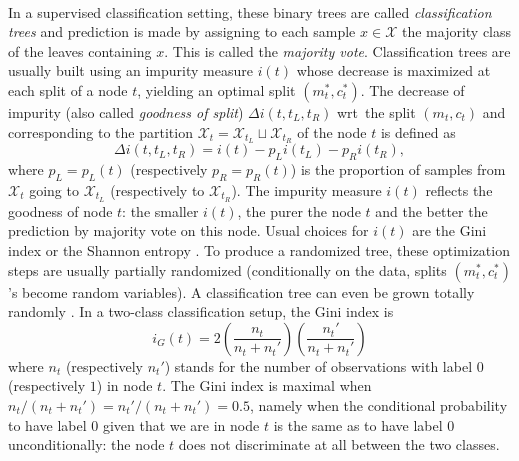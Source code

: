 \paragraph{}
In a supervised classification setting, these binary trees are called
\emph{classification trees} and prediction is made by assigning to each sample
$x \in \mathcal{X}$ the majority class of the leaves containing $x$. This is
called the \emph{majority vote}.  Classification trees are usually built using
an impurity measure $i(t)$ whose decrease is maximized at each split of a node
$t$, yielding an optimal split $(m_t^*, c_t^*)$. The decrease of impurity (also
called \emph{goodness of split}) $\Delta i(t, t_L, t_R)$ \acs{wrt}~the split
$(m_t, c_t)$ and corresponding to the partition
$\mathcal{X}_t=\mathcal{X}_{t_L}\sqcup \mathcal{X}_{t_R}$ of the node $t$ is
defined as
\begin{dmath}
    \label{ocrf:eq:impurity_measure_decrease}
    \Delta i(t, t_L, t_R) = i(t) - p_L i(t_L) - p_R i(t_R),
\end{dmath}
where $p_L = p_L(t)$ (respectively $p_R = p_R(t)$) is the proportion of samples
from $\mathcal{X}_t$ going to $\mathcal{X}_{t_L}$ (respectively to
$\mathcal{X}_{t_R}$).  The impurity measure $i(t)$ reflects the goodness of
node $t$: the smaller $i(t)$, the purer the node $t$ and the better the
prediction by majority vote on this node. Usual choices for $i(t)$ are the Gini
index \citep{Gini1912} or the Shannon entropy \citep{Shannon2001}.  To produce
a randomized tree, these optimization steps are usually partially randomized
(conditionally on the data, splits $(m_t^*, c_t^*)$'s become random variables).
A classification tree can even be grown totally randomly \citep{Geurts2006}.
%
In a two-class classification setup, the Gini index is
\begin{dmath}
    \label{ocrf:eq:gini}
    i_G(t) = 2\left(\frac{n_t}{n_t + n_t'}\right) \left( \frac{n_t'}{n_t +
    n_t'}\right) 
\end{dmath}
where $n_t$ (respectively $n_t'$) stands for the number of observations with
label $0$ (respectively $1$) in node $t$. The Gini index is maximal when
$n_t/(n_t + n_t') = n_t'/(n_t + n_t')=0.5$, namely when the conditional
probability to have label $0$ given that we are in node $t$ is the same as to
have label $0$ unconditionally: the node $t$ does not discriminate at all
between the two classes.
